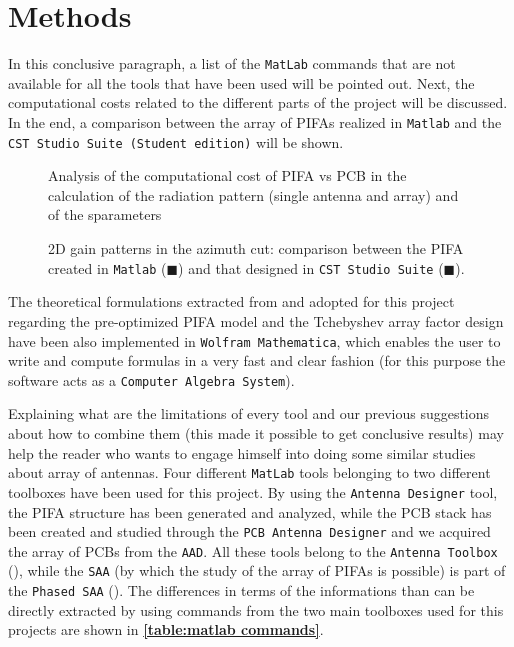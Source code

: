 \documentclass[10 pt,a4paper,twocolumn]{article}
\begin{document}
{\section*{Methods}
In this conclusive paragraph, a list of the \texttt{MatLab} commands that are not available for all the tools that have been used will be pointed out. Next, the computational costs related to the different parts of the project will be discussed. In the end, a comparison between the array of PIFAs realized in \texttt{Matlab} and the \texttt{CST Studio Suite (Student edition)} will be shown. 
\begin{figure}[b!]
	\centering
		\def\svgwidth{0.9\linewidth}
		\tiny{}
		\caption{Analysis of the computational cost of PIFA vs PCB in the calculation of the radiation pattern (single antenna and array) and of the sparameters}
		\label{fig:pifa pcb cost}
	\end{figure}
\begin{figure}[b!]
	\centering
	\def\svgwidth{0.9\linewidth}
	\tiny{}
	\caption{2D gain patterns in the azimuth cut: comparison between the PIFA created in \texttt{Matlab} (\textcolor{myOrange}{$\blacksquare$}) and that designed in \texttt{CST Studio Suite} (\textcolor{myBlue}{$\blacksquare$}).}
\end{figure}
\indent 

The theoretical formulations extracted from \textbf{\cite{Balanis1}} and adopted for this project regarding the pre-optimized PIFA model and the Tchebyshev array factor design have been also implemented in \texttt{Wolfram Mathematica}, which enables the user to write and compute formulas in a very fast and clear fashion (for this purpose the software acts as a \texttt{Computer Algebra System}). 

Explaining what are the limitations of every tool and our previous suggestions about how to combine them (this made it possible to get conclusive results) may help the reader who wants to engage himself into doing some similar studies about array of antennas. Four different \texttt{MatLab} tools belonging to two different toolboxes have been used for this project. By using the \texttt{Antenna Designer} tool, the PIFA structure has been generated and analyzed, while the PCB stack has been created and studied through the \texttt{PCB Antenna Designer} and we acquired the array of PCBs from the \texttt{AAD}. All these tools belong to the \texttt{Antenna Toolbox} (\textbf{\cite{AntennaToolbox}}), while the \texttt{SAA} (by which the study of the array of PIFAs is possible) is part of the \texttt{Phased SAA} (\textbf{\cite{PhasedArraySystemToolbox}}). The differences in terms of the informations than can be directly extracted by using commands from the two main toolboxes used for this projects are shown in \textbf{\cref{table:matlab commands}}. 

}
\end{document}

